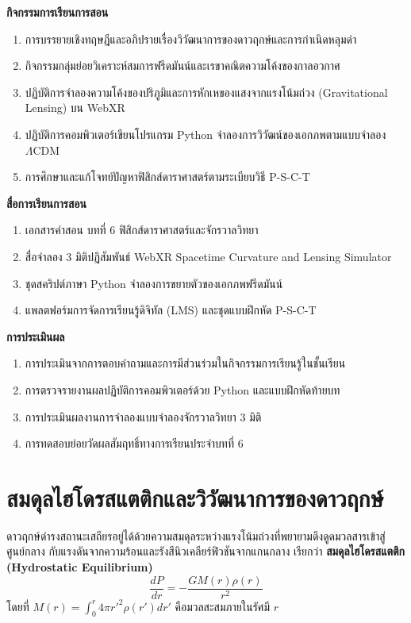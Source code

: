 \begin{lessonplanbox}
\noindent\textbf{กิจกรรมการเรียนการสอน}
\begin{enumerate}
    \item การบรรยายเชิงทฤษฎีและอภิปรายเรื่องวิวัฒนาการของดาวฤกษ์และการกำเนิดหลุมดำ
    \item กิจกรรมกลุ่มย่อยวิเคราะห์สมการฟรีดมันน์และเรขาคณิตความโค้งของกาลอวกาศ
    \item ปฏิบัติการจำลองความโค้งของปริภูมิและการหักเหของแสงจากแรงโน้มถ่วง (Gravitational Lensing) บน WebXR
    \item ปฏิบัติการคอมพิวเตอร์เขียนโปรแกรม Python จำลองการวิวัฒน์ของเอกภพตามแบบจำลอง $\Lambda\text{CDM}$
    \item การศึกษาและแก้โจทย์ปัญหาฟิสิกส์ดาราศาสตร์ตามระเบียบวิธี P-S-C-T
\end{enumerate}

\noindent\textbf{สื่อการเรียนการสอน}
\begin{enumerate}
    \item เอกสารคำสอน บทที่ 6 ฟิสิกส์ดาราศาสตร์และจักรวาลวิทยา
    \item สื่อจำลอง 3 มิติปฏิสัมพันธ์ WebXR Spacetime Curvature and Lensing Simulator
    \item ชุดสคริปต์ภาษา Python จำลองการขยายตัวของเอกภพฟรีดมันน์
    \item แพลตฟอร์มการจัดการเรียนรู้ดิจิทัล (LMS) และชุดแบบฝึกหัด P-S-C-T
\end{enumerate}

\noindent\textbf{การประเมินผล}
\begin{enumerate}
    \item การประเมินจากการตอบคำถามและการมีส่วนร่วมในกิจกรรมการเรียนรู้ในชั้นเรียน
    \item การตรวจรายงานผลปฏิบัติการคอมพิวเตอร์ด้วย Python และแบบฝึกหัดท้ายบท
    \item การประเมินผลงานการจำลองแบบจำลองจักรวาลวิทยา 3 มิติ
    \item การทดสอบย่อยวัดผลสัมฤทธิ์ทางการเรียนประจำบทที่ 6
\end{enumerate}
\end{lessonplanbox}
\newpage

\section{สมดุลไฮโดรสแตติกและวิวัฒนาการของดาวฤกษ์}

ดาวฤกษ์ดำรงสถานะเสถียรอยู่ได้ด้วยความสมดุลระหว่างแรงโน้มถ่วงที่พยายามดึงดูดมวลสารเข้าสู่ศูนย์กลาง กับแรงดันจากความร้อนและรังสีนิวเคลียร์ฟิวชันจากแกนกลาง เรียกว่า \textbf{สมดุลไฮโดรสแตติก (Hydrostatic Equilibrium)}
\begin{equation}
\frac{dP}{dr} = -\frac{G M(r) \rho(r)}{r^2}
\end{equation}
โดยที่ $M(r) = \int_0^r 4\pi {r'}^2 \rho(r') dr'$ คือมวลสะสมภายในรัศมี $r$

